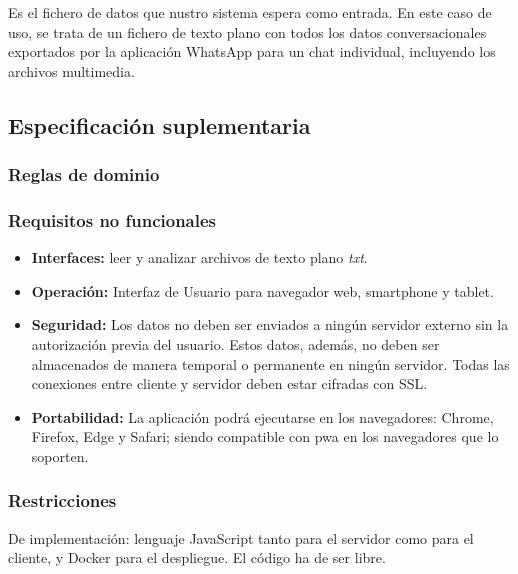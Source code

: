 Es el fichero de datos que nustro sistema espera como entrada. En este caso de uso, se trata de un fichero de texto plano con todos los datos conversacionales exportados por la aplicación WhatsApp para un chat individual, incluyendo los archivos multimedia.

\subsection{Especificación suplementaria}
\label{subsect:suplementary-specification}

\subsubsection{Reglas de dominio}



\subsubsection{Requisitos no funcionales}

\begin{itemize}
	\item \textbf{Interfaces:} leer y analizar archivos de texto plano \textit{txt}. 
	
	\item \textbf{Operación:} Interfaz de Usuario para navegador web, smartphone y tablet.
	
	\item \textbf{Seguridad:} Los datos no deben ser enviados a ningún servidor externo sin la autorización previa del usuario. Estos datos, además, no deben ser almacenados de manera temporal o permanente en ningún servidor. Todas las conexiones entre cliente y servidor deben estar cifradas con SSL.
	
	\item \textbf{Portabilidad:} La aplicación podrá ejecutarse en los navegadores: Chrome, Firefox, Edge y Safari; siendo compatible con \acrshort{pwa} en los navegadores que lo soporten.
\end{itemize}

\subsubsection{Restricciones}
De implementación: lenguaje JavaScript tanto para el servidor como para el cliente, y Docker para el despliegue. El código ha de ser libre.

